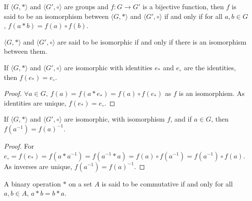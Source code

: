         \begin{definition}
        If $\langle G, * \rangle$ and $\langle G',\circ \rangle$ are groups and $f:G\rightarrow G'$ is a bijective function, then $f$ is said to be an isomorphism between $\langle G, *\rangle$ and $\langle G',\circ \rangle$ if and only if for all $a,b\in G$, $f(a*b) =f(a)\circ f(b)$.
        \end{definition}
        \begin{definition}
        $\langle G, *\rangle$ and $\langle G', \circ \rangle$ are said to be isomorphic if and only if there is an isomorphism between them.
        \end{definition}
        \begin{theorem}
        If $\langle G, * \rangle$ and $\langle G', \circ \rangle$ are isomorphic with identities $e_*$ and $e_{\circ}$ are the identities, then $f(e_*) = e_{\circ}$.
        \end{theorem}
        \begin{proof}
        $\forall a\in G,\ f(a)=f(a* e_*) = f(a)\circ f(e_*)$ as $f$ is an isomorphism. As identities are unique, $f(e_*) = e_{\circ}$.
        \end{proof}
        \begin{theorem}
        If $\langle G, * \rangle$ and $\langle G', \circ \rangle$ are isomorphic, with isomorphism $f$, and if $a\in G$, then $f(a^{-1}) = f(a)^{-1}$.
        \end{theorem}
        \begin{proof}
        For $e_{\circ}=f(e_*) = f(a*a^{-1}) = f(a^{-1}*a) = f(a)\circ f(a^{-1})=f(a^{-1})\circ f(a)$. As inverses are unique, $f(a^{-1})=f(a)^{-1}$.
        \end{proof}
        \begin{definition}
        A binary operation $*$ on a set $A$ is said to be commutative if and only for all $a,b\in A$, $a*b = b*a$.
        \end{definition}
